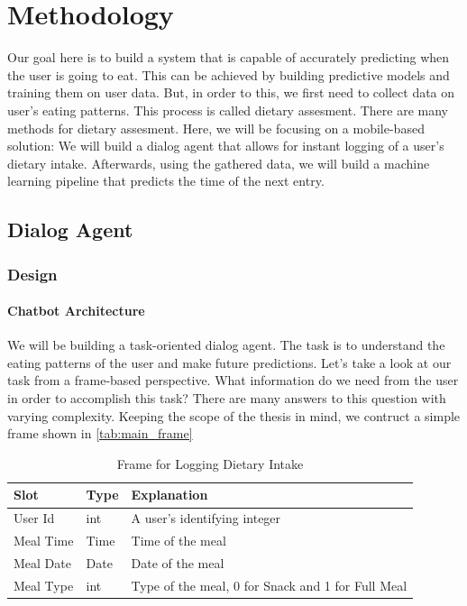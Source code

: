 
\chapter{Methodology}\label{chapter:methodology}
Our goal here is to build a system that is capable of accurately predicting when the user is going to eat.
This can be achieved by building predictive models and training them on user data.
But, in order to this, we first need to collect data on user's eating patterns.
This process is called dietary assesment.
There are many methods for dietary assesment.
Here, we will be focusing on a mobile-based solution:
We will build a dialog agent that allows for instant logging of a user's dietary intake.
Afterwards, using the gathered data, we will build a machine learning pipeline that predicts the time of the next entry.

\section{Dialog Agent}
\subsection{Design}
\subsubsection{Chatbot Architecture}
We will be building a task-oriented dialog agent.
The task is to understand the eating patterns of the user and make future predictions.
Let's take a look at our task from a frame-based perspective.
What information do we need from the user in order to accomplish this task?
There are many answers to this question with varying complexity.
Keeping the scope of the thesis in mind, we contruct a simple frame shown in \autoref{tab:main_frame}

\begin{table}[htbp]
  \caption[Frame for Logging Dietary Intake]{Frame for Logging Dietary Intake}\label{tab:main_frame}
  \centering
  \begin{tabular}{l|l|l}
    Slot&Type&Explanation\\ \toprule
    User Id&int&A user's identifying integer \\ \hline
    Meal Time&Time&Time of the meal\\ \hline
    Meal Date&Date&Date of the meal\\ \hline
    Meal Type&int&Type of the meal, 0 for Snack and 1 for Full Meal \\ \hline
  \end{tabular}
\end{table}


